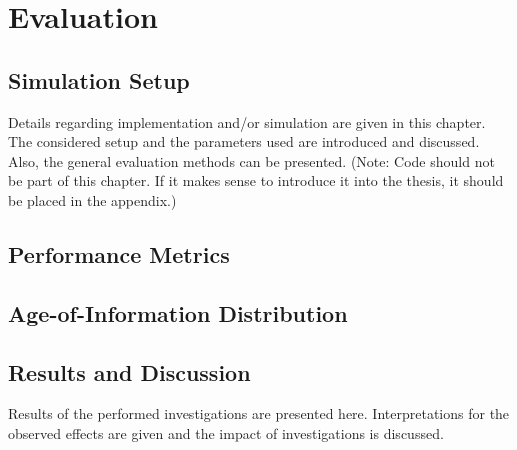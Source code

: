 \chapter{Evaluation}
\section{Simulation Setup}
Details regarding implementation and/or simulation are given in this chapter.
The considered setup and the parameters used are introduced and discussed. Also,
the general evaluation methods can be presented. (Note: Code should not be part
of this chapter. If it makes sense to introduce it into the thesis, it should be
placed in the appendix.)

\section{Performance Metrics}

\section{Age-of-Information Distribution}

\section{Results and Discussion}
Results of the performed investigations are presented here. Interpretations for
the observed effects are given and the impact of investigations is discussed. 
